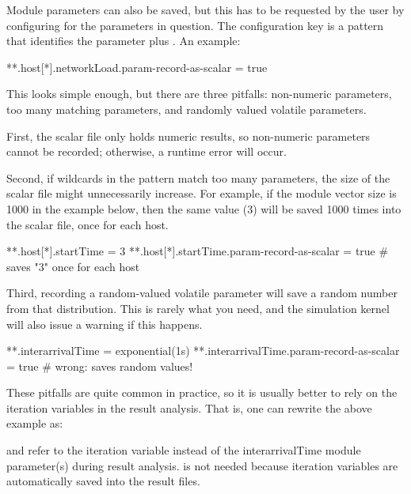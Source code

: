 Module parameters can also be saved, but this has to be requested by the user by
configuring  for the parameters in question.
The configuration key is a pattern that identifies the parameter plus
. An example:

\begin{inifile}
**.host[*].networkLoad.param-record-as-scalar = true
\end{inifile}

This looks simple enough, but there are three pitfalls: non-numeric parameters,
too many matching parameters, and randomly valued volatile parameters.

First, the scalar file only holds numeric results, so non-numeric parameters
cannot be recorded; otherwise, a runtime error will occur.

Second, if wildcards in the pattern match too many parameters, the size of the
scalar file might unnecessarily increase. For example, if the 
module vector size is 1000 in the example below, then the same value (3) will be
saved 1000 times into the scalar file, once for each host.

\begin{inifile}
**.host[*].startTime = 3
**.host[*].startTime.param-record-as-scalar = true  # saves "3" once for each host
\end{inifile}

Third, recording a random-valued volatile parameter will save a random number
from that distribution. This is rarely what you need, and the simulation kernel
will also issue a warning if this happens.

\begin{inifile}
**.interarrivalTime = exponential(1s)
**.interarrivalTime.param-record-as-scalar = true  # wrong: saves random values!
\end{inifile}

These pitfalls are quite common in practice, so it is usually better to rely on
the iteration variables in the result analysis. That is, one can rewrite the
above example as:


and refer to the  iteration variable instead of the interarrivalTime
module parameter(s) during result analysis.  is
not needed because iteration variables are automatically saved into the result
files.

